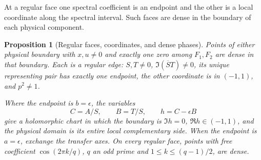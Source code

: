 \documentclass[11pt]{article}
\numberwithin{equation}{section}
\newtheorem{proposition}[theorem]{Proposition}
\theoremstyle{definition}
\begin{document}
At a regular face one spectral coefficient is an endpoint and the
other is a local coordinate along the spectral interval. Such faces
are dense in the boundary of each physical component.

\begin{proposition}[Regular faces, coordinates, and dense phases]
\label{geo:new:faces}
Points of either physical boundary with $x,u\ne0$ and exactly
one zero among $F_1,F_2$ are dense in that boundary.  Each is
a regular edge: $S,T\ne0$, $\Im(\overline S T)\ne0$, its
unique representing pair has exactly one endpoint, the other
coordinate is in $(-1,1)$, and $p^2\ne1$.

Where the endpoint is $b=\epsilon$, the variables
\[
 C=A/S,\qquad B=T/S,\qquad h=C-\epsilon B
\]
give a holomorphic chart in which the boundary is $\Im h=0$,
$\Re h\in(-1,1)$, and the physical domain is its entire local
complementary side.  When the endpoint is $a=\epsilon$, exchange
the transfer axes.  On every regular face, points with free
coefficient $\cos(2\pi k/q)$, $q$ an odd prime and
$1\leq k\leq(q-1)/2$, are dense.
\end{proposition}
\end{document}
